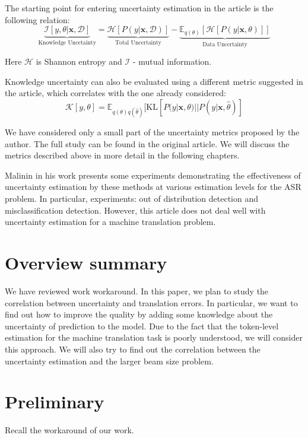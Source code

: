 \documentclass[a4paper,14pt]{extarticle}
\begin{document}
	The starting point for entering uncertainty estimation in the article is the following relation:
	\begin{equation}
		\underbrace{\mathcal{I}[y, \theta|\textbf{x}, \mathcal{D}]}_\text{Knowledge Uncetainty}
		= 
		\underbrace{\mathcal{H}[P(y | \textbf{x}, \mathcal{D})]}_\text{Total Uncertainty}
		-
		\underbrace{\mathbb{E}_{q(\theta)}[\mathcal{H}[P(y| \textbf{x}, \theta)]]}_\text{Data Uncertainty}
	\end{equation}
	
	Here $\mathcal{H}$ is Shannon entropy and $\mathcal{I}$ - mutual information.
	
	Knowledge uncertainty can also be evaluated using a different metric suggested in the article, which correlates with the one already considered:
	\begin{equation}
		\mathcal{K}[y, \theta] = \mathbb{E}_{q(\theta)q(\hat{\theta})}[
			\mathrm{KL}[P(y|\textbf{x}, \theta) || P(y|\textbf{x}, \hat{\theta})
		]
	\end{equation}
	
	We have considered only a small part of the uncertainty metrics proposed by the author. The full study can be found in the original article. We will discuss the metrics described above in more detail in the following chapters.

	Malinin in his work presents some experiments demonstrating the effectiveness of uncertainty estimation by these methods at various estimation levels for the ASR problem. In particular, experiments: out of distribution detection and misclassification detection. However, this article does not deal well with uncertainty estimation for a machine translation problem.
	\section{Overview summary}
	We have reviewed work workaround. In this paper, we plan to study the correlation between uncertainty and translation errors. In particular, we want to find out how to improve the quality by adding some knowledge about the uncertainty of prediction to the model. Due to the fact that the token-level estimation for the machine translation task is poorly understood, we will consider this approach. We will also try to find out the correlation between the uncertainty estimation and the larger beam size problem.
\section{Preliminary}
	Recall the workaround of our work.
\end{document}
